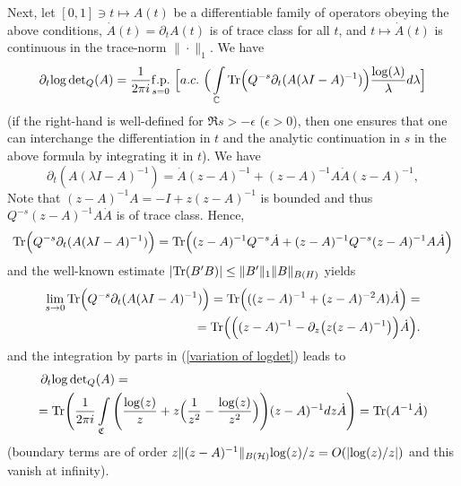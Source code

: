 \documentclass{amsart}
\begin{document}
Next, let $[0,1]\ni t\mapsto A(t)$ be a differentiable family of operators obeying the above conditions, $\dot{A}(t)=\partial_t A(t)$ is of trace class for all $t$, and $t\mapsto \dot{A}(t)$ is continuous in the trace-norm $\|\cdot\|_1$. We have
\begin{equation}
\label{variation of logdet}
\partial_t{\rm log}\,{\rm det}_Q(A)=\frac{1}{2\pi i}\underset{s=0}{\rm f.p.}\,\,\Big[a.c.\,\,\Big(\int\limits_{\mathbb{C}}{\rm Tr}\Big(Q^{-s}\partial_t(A(\lambda I-A)^{-1})\Big)\frac{{\rm log}(\lambda)}{\lambda}d\lambda\Big]
\end{equation}
(if the right-hand is well-defined for $\Re s>-\epsilon$ ($\epsilon>0$), then one ensures that one can interchange the differentiation in $t$ and the analytic continuation in $s$ in the above formula by integrating it in $t$). We have
$$\partial_t(A(\lambda I-A)^{-1})=\dot{A}(z-A)^{-1}+(z-A)^{-1}A\dot{A}(z-A)^{-1},$$
Note that $(z-A)^{-1}A=-I+z(z-A)^{-1}$ is bounded and thus $Q^{-s}(z-A)^{-1}A\dot{A}$ is of trace class. Hence,
$${\rm Tr}\Big(Q^{-s}\partial_t(A(\lambda I-A)^{-1})\Big)={\rm Tr}\Big((z-A)^{-1}Q^{-s}\dot{A}+(z-A)^{-1}Q^{-s}(z-A)^{-1}A\dot{A}\Big)$$
and the well-known estimate $|{\rm Tr}(B'B)|\le\|B'\|_{1}\|B\|_{B(H)}$ yields
\begin{align*}
\lim_{s\to 0}{\rm Tr}\Big(Q^{-s}\partial_t(A(\lambda I-A)^{-1})\Big)={\rm Tr}\Big(((z-A)^{-1}+(z-A)^{-2}A)\dot{A}\Big)=\\
={\rm Tr}\Big(\Big((z-A)^{-1}-\partial_z\big(z(z-A)^{-1}\big)\Big)\dot{A}\Big).
\end{align*}
and the integration by parts in (\ref{variation of logdet}) leads to
\begin{align}
\label{variation formula}
\begin{split}
\partial_t{\rm log}\,{\rm det}_Q&(A)=\\
={\rm Tr}\Bigg(\frac{1}{2\pi i}&\int\limits_{\mathfrak{C}}\Bigg(\frac{{\rm log}(z)}{z}+z\Big(\frac{1}{z^{2}}-\frac{{\rm log}(z)}{z^2}\Big)\Bigg)(z-A)^{-1}dz\dot{A}\Bigg)={\rm Tr}(A^{-1}\dot{A})
\end{split}
\end{align}
(boundary terms are of order $z\|(z-A)^{-1}\|_{B(\mathcal{H})}{\rm log}(z)/z=O(|{\rm log}(z)/z|)$ and this vanish at infinity).
\end{document}
